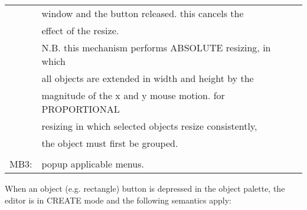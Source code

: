 \begin{tabular}{ll}
	  & window and the button released.  this cancels the\\
	  & effect of the resize.\\
	  & N.B. this mechanism performs ABSOLUTE resizing, in which\\
	  & all objects are extended in width and height by the\\
	  & magnitude of the x and y mouse motion.  for PROPORTIONAL\\
	  & resizing in which selected objects resize consistently,\\
	  & the object must first be grouped.\\
\\
MB3: & popup applicable menus.\\
\end{tabular}

\newpage
\noindent When an object (e.g. rectangle) button is depressed in the object
palette, the editor is in CREATE mode and the following semantics apply:\\

